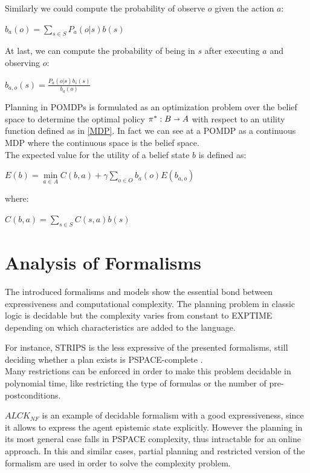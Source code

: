 \documentclass[pdftex,12pt,a4paper]{report}
\begin{document}
\noindent Similarly we could compute the probability of observe $o$ given the action $a$:
\begin{center}
\noindent $b_a(o) = \sum\limits_{s \in S} P_a(o|s)b(s)$ 
\end{center}

\noindent At last, we can compute the probability of being in $s$ after executing $a$ and observing $o$:
\begin{center}
\noindent $b_{a,o}(s) = \frac{P_a(o|s)b_s(s)}{b_a(o)}$ 
\end{center}

\noindent Planning in POMDPs is formulated as an optimization problem over the belief space to determine the optimal policy $\pi^* : B \shortrightarrow A$ with respect to an utility function defined as in \ref{MDP}. In fact we can see at a POMDP as a continuous MDP where the continuous space is the belief space.
\\\noindent The expected value for the utility of a belief state $b$ is defined as:
\begin{center}
\noindent $E(b) = \min\limits_{a \in A} C(b,a) + \gamma \sum\limits_{o \in O}b_a(o)E(b_{a,o})$ 
\end{center}
\noindent where:
\begin{center}
\noindent $C(b,a) = \sum\limits_{s \in S}C(s,a)b(s)$ 
\end{center}

\section{Analysis of Formalisms}\label{analysis}
The introduced formalisms and models show the essential bond between expressiveness and computational complexity. The planning problem in classic logic is decidable but the complexity varies from constant to EXPTIME depending on which characteristics are added to the language. 
\newline

\noindent For instance, STRIPS is the less expressive of the presented formalisms, still deciding whether a plan exists is PSPACE-complete \cite{bylander1994computational}.\\%
Many restrictions can be enforced in order to make this problem decidable in polynomial time, like restricting the type of formulas or the number of pre-postconditions. 
\newline

\noindent $ALCK_{NF}$ is an example of decidable formalism with a good expressiveness, since it allows to express the agent epistemic state explicitly. However the planning in its most general case falls in PSPACE complexity, thus intractable for an online approach. In this and similar cases, partial planning and restricted version of the formalism are used in order to solve the complexity problem.
\newline
\end{document}
